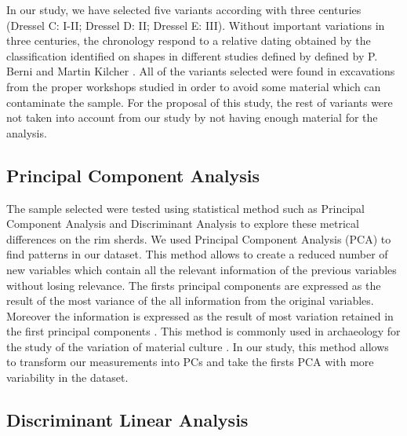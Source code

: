 \documentclass[review]{elsarticle}
\begin{document}
In our study, we have selected five variants according with three centuries
(Dressel C: I-II; Dressel D: II; Dressel E: III). Without important variations in three centuries, the chronology respond to a relative dating obtained by the classification identified on shapes in different studies defined by defined by P. Berni \citep{berni_millet_epigrafianforica_2008} and Martin Kilcher \citep{martin-kilcher_romischen_1994}. All of the variants selected were found in excavations from the proper workshops studied in order to avoid some material which can contaminate the sample. For the proposal of this study, the rest of variants were not taken into account from our study by not having enough material for the analysis. 


\subsection{Principal Component Analysis}

The sample selected were tested using statistical method such as Principal Component Analysis and Discriminant Analysis to explore these metrical differences on the rim sherds. 
We used Principal Component Analysis (PCA) to find patterns in our dataset. This method allows to create a reduced number of new variables which contain all the relevant information of the previous variables without losing relevance. The firsts principal components are expressed as the result of the most variance of the all information from the original variables. Moreover the information is expressed as the result of most variation retained in the first principal components \citep{jolliffe_principal_2002, shennan_quantifying_1997}. This method is commonly used in archaeology for the study of the variation of material culture \citep{li_crossbows_2014, schillinger_differences_2016}. In our study, this method allows to transform our measurements into PCs and take the firsts PCA with more variability in the dataset.  


\subsection{Discriminant Linear Analysis} 
\end{document}
